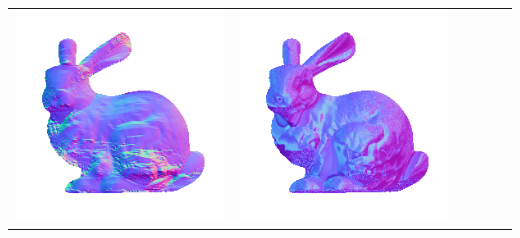 \begin{center}
\begin{tabularx}{\linewidth}{@{}Y@{}Y@{}Y@{}Y@{}Y@{}Y@{}}
\includegraphics[width=\linewidth]{semisynthetic/20150514_14_yu_out.png} &
\includegraphics[width=\linewidth]{semisynthetic/20150514_14_dpsn_out.png} &

\end{tabularx}
\end{center}
